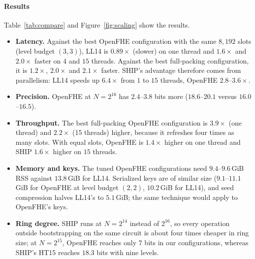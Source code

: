 \documentclass[sigconf,nonacm]{acmart}
\begin{document}
\paragraph{Results}
Table~\ref{tab:compare} and Figure~\ref{fig:scaling} show the results.
\begin{itemize}
\item \textbf{Latency.} Against the best OpenFHE configuration with the same $8{,}192$ slots (level budget $(3,3)$), LL14 is $0.89\times$ (slower) on one thread and $1.6\times$ and $2.0\times$ faster on $4$ and $15$ threads. Against the best full-packing configuration, it is $1.2\times$, $2.0\times$ and $2.1\times$ faster. SHIP's advantage therefore comes from parallelism: LL14 speeds up $6.4\times$ from $1$ to $15$ threads, OpenFHE $2.8$--$3.6\times$.
\item \textbf{Precision.} OpenFHE at $N=2^{16}$ has $2.4$--$3.8$ bits more ($18.6$--$20.1$ versus $16.0$--$16.5$).
\item \textbf{Throughput.} The best full-packing OpenFHE configuration is $3.9\times$ (one thread) and $2.2\times$ (15 threads) higher, because it refreshes four times as many slots. With equal slots, OpenFHE is $1.4\times$ higher on one thread and SHIP $1.6\times$ higher on $15$ threads.
\item \textbf{Memory and keys.} The tuned OpenFHE configurations need $9.4$--$9.6$\,GiB RSS against $13.8$\,GiB for LL14. Serialized keys are of similar size ($9.1$--$11.1$\,GiB for OpenFHE at level budget $(2,2)$, $10.2$\,GiB for LL14), and seed compression halves LL14's to $5.1$\,GiB; the same technique would apply to OpenFHE's keys.
\item \textbf{Ring degree.} SHIP runs at $N=2^{14}$ instead of $2^{16}$, so every operation outside bootstrapping on the same circuit is about four times cheaper in ring size; at $N=2^{15}$, OpenFHE reaches only $7$ bits in our configurations, whereas SHIP's HT15 reaches $18.3$ bits with nine levels.
\end{itemize}
\end{document}
